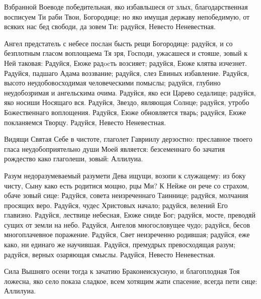 \begin{mymulticols}



Взбранной Воеводе победительная, яко избавльшеся от злых, благодарственная восписуем Ти раби Твои, Богородице; но яко имущая державу непобедимую, от всяких нас бед свободи, да зовем Ти: радуйся, Невесто Неневестная.


Ангел предстатель с небесе послан бысть рещи Богородице: радуйся, и со безплотным гласом воплощаема Тя зря, Господи, ужасашеся и стояше, зовый к Ней таковая: Радуйся, Еюже радocть возсияет; радуйся, Еюже клятва изчезнет. Радуйся, падшаго Адама воззвание; радуйся, слез Евиных избавление. Радуйся, высото неудобовосходимая человеческими помыслы; радуйся, глубино неудобозримая и ангельскима очима. Радуйся, яко еси Царево седалище; радуйся, яко носиши Носящаго вся. Радуйся, Звездо, являющая Солнце; радуйся, утробо Божественнаго воплощения. Радуйся, Еюже обновляется тварь; радуйся, Еюже покланяемся Творцу. Радуйся, Невесто Неневестная.


Видящи Святая Себе в чистоте, глаголет Гавриилу дерзостно: преславное твоего гласа неудобоприятельно души Моей является: безсеменнаго бо зачатия рождество како глаголеши, зовый: Аллилуиа.


Разум недоразумеваемый разумети Дева ищущи, возопи к служащему: из боку чисту, Сыну како есть родитися мощно, рцы Ми? К Нейже он рече со страхом, обаче зовый сице: Радуйся, совета неизреченнаго Таиннице; радуйся, молчания просящих веро. Радуйся, чудес Христовых начало; радуйся, велений Его главизно. Радуйся, лествице небесная, Еюже сниде Бог; радуйся, мосте, преводяй сущих от земли на небо. Радуйся, Ангелов многословущее чудо; радуйся, бесов многоплачевное поражение. Радуйся, Свет неизреченно родившая; радуйся, еже како, ни единаго же научившая. Радуйся, премудрых превосходящая разум; радуйся, верных озаряющая смыслы. Радуйся, Невесто Неневестная.


Сила Вышняго осени тогда к зачатию Браконеискусную, и благоплодная Тоя ложесна, яко село показа сладкое, всем хотящим жати спасение, всегда пети сице: Аллилуиа.


\end{mymulticols}
